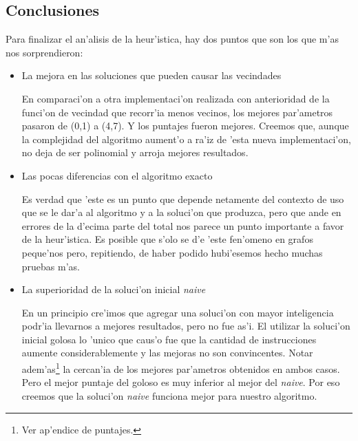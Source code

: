 \subsection{Conclusiones}
Para finalizar el an'alisis de la heur'istica, hay dos puntos que son los que m'as nos sorprendieron:
\begin{itemize}
\item La mejora en las soluciones que pueden causar las vecindades

En comparaci'on a otra implementaci'on realizada con anterioridad de la funci'on de vecindad que recorr'ia menos vecinos, los mejores par'ametros pasaron de (0,1) a (4,7). Y los puntajes fueron mejores. Creemos que, aunque la complejidad del algoritmo aument'o a ra'iz de 'esta nueva implementaci'on, no deja de ser polinomial y arroja mejores resultados.

\item Las pocas diferencias con el algoritmo exacto

Es verdad que 'este es un punto que depende netamente del contexto de uso que se le dar'a al algoritmo y a la soluci'on que produzca, pero que ande en errores de la d'ecima parte del total nos parece un punto importante a favor de la heur'istica. Es posible que s'olo se d'e 'este fen'omeno en grafos peque'nos pero, repitiendo, de haber podido hubi'esemos hecho muchas pruebas m'as.

\item La superioridad de la soluci'on inicial \emph{naive}

En un principio cre'imos que agregar una soluci'on con mayor inteligencia podr'ia llevarnos a mejores resultados, pero no fue as'i. El utilizar la soluci'on inicial golosa lo 'unico que caus'o fue que la cantidad de instrucciones aumente considerablemente y las mejoras no son convincentes. Notar adem'as\footnote{Ver ap'endice de puntajes.} la cercan'ia de los mejores par'ametros obtenidos en ambos casos. Pero el mejor puntaje del goloso es muy inferior al mejor del \emph{naive}. Por eso creemos que la soluci'on \emph{naive} funciona mejor para nuestro algoritmo. 

\end{itemize}
